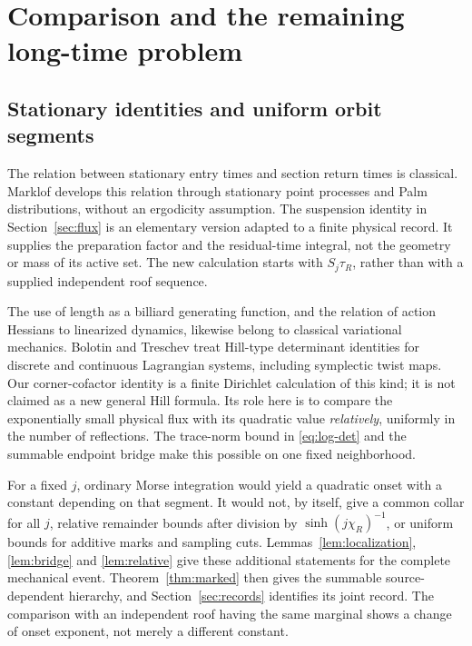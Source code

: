 \section{Comparison and the remaining long-time problem}
\label{sec:comparison}
\subsection{Stationary identities and uniform orbit segments}
The relation between stationary entry times and section return times is
classical. Marklof \cite{Marklof} develops this relation through stationary
point processes and Palm distributions, without an ergodicity assumption.
The suspension identity in Section~\ref{sec:flux} is an elementary version
adapted to a finite physical record. It supplies the preparation factor
and the residual-time integral, not the geometry or mass of its active set.
The new calculation starts with $S_j\tau_R$, rather than with a supplied
independent roof sequence.

The use of length as a billiard generating function, and the relation of
action Hessians to linearized dynamics, likewise belong to classical
variational mechanics. Bolotin and Treschev \cite{Hill} treat Hill-type
determinant identities for discrete and continuous Lagrangian systems,
including symplectic twist maps. Our corner-cofactor identity is a finite
Dirichlet calculation of this kind; it is not claimed as a new general
Hill formula. Its role here is to compare the exponentially small physical
flux with its quadratic value \emph{relatively}, uniformly in the number
of reflections. The trace-norm bound in \eqref{eq:log-det} and the summable
endpoint bridge make this possible on one fixed neighborhood.

For a fixed $j$, ordinary Morse integration would yield a quadratic onset
with a constant depending on that segment. It would not, by itself, give
a common collar for all $j$, relative remainder bounds after division by
$\sinh(j\chi_R)^{-1}$, or uniform bounds for additive marks and sampling
cuts. Lemmas~\ref{lem:localization}, \ref{lem:bridge} and
\ref{lem:relative} give these additional statements for the complete
mechanical event. Theorem~\ref{thm:marked} then gives the summable
source-dependent hierarchy, and Section~\ref{sec:records} identifies
its joint record. The comparison with an independent roof having the same
marginal shows a change of onset exponent, not merely a different constant.

